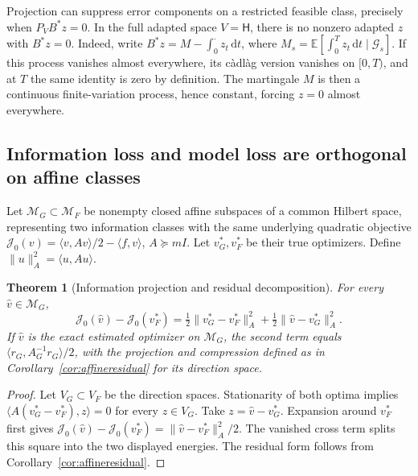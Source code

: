 \documentclass[11pt]{article}
\theoremstyle{plain}
\newtheorem{theorem}{Theorem}[section]
\theoremstyle{definition}
\theoremstyle{remark}
\newcommand{\E}{\mathbb E}
\newcommand{\dd}{\,\mathrm d}
\newcommand{\norm}[1]{\lVert#1\rVert}
\newcommand{\ip}[2]{\langle#1,#2\rangle}
\begin{document}
Projection can suppress error components on a restricted feasible
class, precisely when \(P_VB^\ast z=0\). In the full adapted space
\(V=\mathsf H\), there is no nonzero adapted \(z\) with
\(B^\ast z=0\). Indeed, write
\(B^\ast z=M-\int_0^\cdot z_t\dd t\), where
\(M_s=\E[\int_0^Tz_t\dd t\mid\mathcal G_s]\).
If this process vanishes almost everywhere, its c\`adl\`ag version
vanishes on \([0,T)\), and at \(T\) the same identity is zero by
definition. The martingale \(M\) is then a continuous finite-variation
process, hence constant, forcing \(z=0\) almost everywhere.

\subsection{Information loss and model loss are orthogonal on affine classes}

Let \(\mathcal M_G\subset\mathcal M_F\) be nonempty closed affine
subspaces of a common Hilbert space, representing two information
classes with the same underlying quadratic objective
\(\mathcal J_0(v)=\ip{v}{Av}/2-\ip{f}{v}\), \(A\succeq mI\).
Let \(v_G^\ast,v_F^\ast\) be their true optimizers. Define
\(\norm u_A^2=\ip{u}{Au}\).

\begin{theorem}[Information projection and residual decomposition]
\label{thm:informationprojection}
For every \(\widehat v\in\mathcal M_G\),
\begin{equation}\label{eq:informationprojection}
\mathcal J_0(\widehat v)-\mathcal J_0(v_F^\ast)
=\tfrac12\norm{v_G^\ast-v_F^\ast}_A^2
 +\tfrac12\norm{\widehat v-v_G^\ast}_A^2.
\end{equation}
If \(\widehat v\) is the exact estimated optimizer on \(\mathcal M_G\),
the second term equals
\(\ip{r_G}{A_G^{-1}r_G}/2\), with the projection and compression
defined as in Corollary~\ref{cor:affineresidual} for its direction space.
\end{theorem}
\begin{proof}
Let \(V_G\subset V_F\) be the direction spaces.
Stationarity of both optima implies
\(\ip{A(v_G^\ast-v_F^\ast)}{z}=0\) for every \(z\in V_G\).
Take \(z=\widehat v-v_G^\ast\).
Expansion around \(v_F^\ast\) first gives
\(\mathcal J_0(\widehat v)-\mathcal J_0(v_F^\ast)
=\norm{\widehat v-v_F^\ast}_A^2/2\).
The vanished cross term splits this square into the two displayed
energies. The residual form follows from
Corollary~\ref{cor:affineresidual}.
\end{proof}
\end{document}
